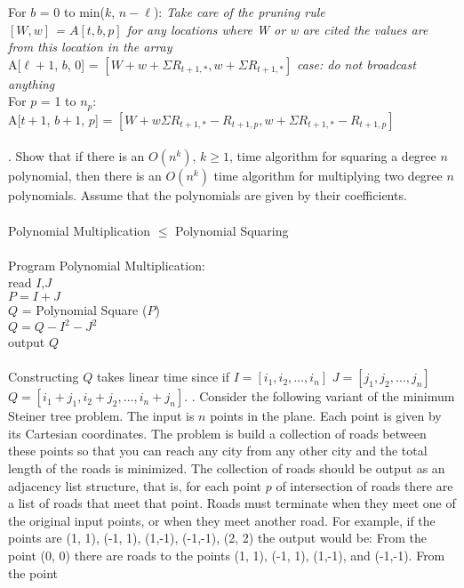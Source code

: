 \documentclass[10pt]{article}
\newcommand{\tab}{\hspace*{2em}}
\newcommand{\tabb}{\hspace*{4em}}
\newcommand{\tabbb}{\hspace*{6em}}
\begin{document}
		\tab For $b$ = 0 to min($k$, $n-\ell$): \emph{Take care of the pruning rule}\\
		\tabb \emph{$[W,w]$ = $A[t,b,p]$ for any locations where W or w are cited the values are from this location in the array}\\
		\tabb A[$\ell+1$, $b$, 0] = $[W+w+\Sigma R_{t+1,*}, w+\Sigma R_{t+1,*}]$ \emph{case: do not broadcast anything}\\ 
		\tabb For $p$ = 1 to $n_p$:\\
		\tabbb A[$t+1$, $b+1$, $p$] = $[W+w\Sigma R_{t+1,*} - R_{t+1,p}, w+\Sigma R_{t+1,*} - R_{t+1,p}]$\\
		\\
		. Show that if there is an $O(n^k)$, $k \geq 1$, time algorithm for squaring a degree $n$ polynomial,
		then there is an $O(n^k)$ time algorithm for multiplying two degree $n$ polynomials. Assume that the polynomials
		are given by their coefficients.\\
		\\
		Polynomial Multiplication $\leq$ Polynomial Squaring\\
		\\
		Program Polynomial Multiplication:\\
		\tab read $I$,$J$\\
		\tab $P = I + J$\\
		\tab $Q$ = Polynomial Square ($P$)\\
		\tab $Q = Q - I^2 - J^2$\\
		\tab output $Q$\\
		\\
		Constructing $Q$ takes linear time since if $I = [i_1, i_2, \ldots, i_n]$ $J = [j_1, j_2, \ldots, j_n]$ 
		$Q = [i_1+j_1, i_2+j_2, \ldots, i_n+j_n]$. 
		. Consider the following variant of the minimum Steiner tree problem. The input is $n$ points in the plane.
		Each point is given by its Cartesian coordinates. The problem is build a collection of roads between
		these points so that you can reach any city from any other city and the total length of the roads is
		minimized. The collection of roads should be output as an adjacency list structure, that is, for each
		point $p$ of intersection of roads there are a list of roads that meet that point. Roads must terminate
		when they meet one of the original input points, or when they meet another road. For example, if the
		points are (1, 1), (-1, 1), (1,-1), (-1,-1), (2, 2) the output would be:
		From the point (0, 0) there are roads to the points (1, 1), (-1, 1), (1,-1), and (-1,-1). From the point
\end{document}
